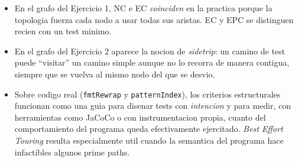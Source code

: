 \documentclass[12pt,a4paper]{article}
\begin{document}
\begin{itemize}
  \item En el grafo del Ejercicio 1, NC e EC \emph{coinciden} en la practica porque la topologia
  fuerza cada nodo a usar todas sus aristas. EC y EPC se distinguen recien con un test minimo.

  \item En el grafo del Ejercicio 2 aparece la nocion de \textit{sidetrip}: un camino de test
  puede ``visitar'' un camino simple aunque no lo recorra de manera contigua, siempre que se
  vuelva al mismo nodo del que se desvio.

  \item Sobre codigo real (\texttt{fmtRewrap} y \texttt{patternIndex}), los criterios estructurales
  funcionan como una guia para disenar tests con \emph{intencion} y para medir, con herramientas
  como JaCoCo o con instrumentacion propia, cuanto del comportamiento del programa queda
  efectivamente ejercitado. \textit{Best Effort Touring} resulta especialmente util cuando la
  semantica del programa hace infactibles algunos prime paths.
\end{itemize}
\end{document}

